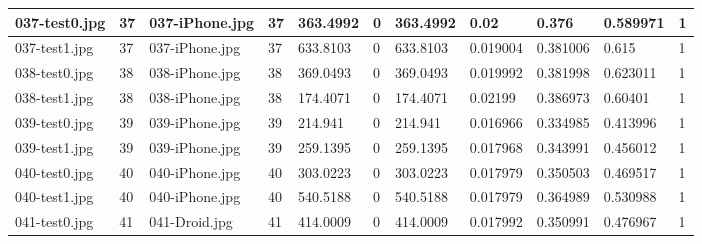 \begin{landscape}
\begin{longtable}{|p{2cm}|p{1cm}|p{2cm}|p{1cm}|p{2cm}|p{1cm}|p{2cm}|p{2cm}|p{2cm}|p{2cm}|p{1cm}|}
	037-test0.jpg   & 37               & 037-iPhone.jpg        & 37                          & 363.4992              & 0                       & 363.4992                   & 0.02                  & 0.376                 & 0.589971                 & 1                \\ \hline
	037-test1.jpg   & 37               & 037-iPhone.jpg        & 37                          & 633.8103              & 0                       & 633.8103                   & 0.019004              & 0.381006              & 0.615                    & 1                \\ \hline
	038-test0.jpg   & 38               & 038-iPhone.jpg        & 38                          & 369.0493              & 0                       & 369.0493                   & 0.019992              & 0.381998              & 0.623011                 & 1                \\ \hline
	038-test1.jpg   & 38               & 038-iPhone.jpg        & 38                          & 174.4071              & 0                       & 174.4071                   & 0.02199               & 0.386973              & 0.60401                  & 1                \\ \hline
	039-test0.jpg   & 39               & 039-iPhone.jpg        & 39                          & 214.941               & 0                       & 214.941                    & 0.016966              & 0.334985              & 0.413996                 & 1                \\ \hline
	039-test1.jpg   & 39               & 039-iPhone.jpg        & 39                          & 259.1395              & 0                       & 259.1395                   & 0.017968              & 0.343991              & 0.456012                 & 1                \\ \hline
	040-test0.jpg   & 40               & 040-iPhone.jpg        & 40                          & 303.0223              & 0                       & 303.0223                   & 0.017979              & 0.350503              & 0.469517                 & 1                \\ \hline
	040-test1.jpg   & 40               & 040-iPhone.jpg        & 40                          & 540.5188              & 0                       & 540.5188                   & 0.017979              & 0.364989              & 0.530988                 & 1                \\ \hline
	041-test0.jpg   & 41               & 041-Droid.jpg         & 41                          & 414.0009              & 0                       & 414.0009                   & 0.017992              & 0.350991              & 0.476967                 & 1                \\ \hline

\end{longtable}
\end{landscape}
